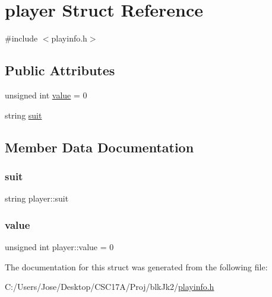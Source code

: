 \hypertarget{structplayer}{}\section{player Struct Reference}
\label{structplayer}


{\ttfamily \#include $<$playinfo.\+h$>$}

\subsection*{Public Attributes}
\begin{DoxyCompactItemize}
\item 
unsigned int \hyperlink{structplayer_a16a403f59b795c914193b68929cd0166}{value} = 0
\item 
string \hyperlink{structplayer_ace5ff9c841167c6e7fb3df5812819f6b}{suit}
\end{DoxyCompactItemize}


\subsection{Member Data Documentation}
\hypertarget{structplayer_ace5ff9c841167c6e7fb3df5812819f6b}{}\label{structplayer_ace5ff9c841167c6e7fb3df5812819f6b} 
\subsubsection{\texorpdfstring{suit}{suit}}
{\footnotesize\ttfamily string player\+::suit}

\hypertarget{structplayer_a16a403f59b795c914193b68929cd0166}{}\label{structplayer_a16a403f59b795c914193b68929cd0166} 
\subsubsection{\texorpdfstring{value}{value}}
{\footnotesize\ttfamily unsigned int player\+::value = 0}



The documentation for this struct was generated from the following file\+:\begin{DoxyCompactItemize}
\item 
C\+:/\+Users/\+Jose/\+Desktop/\+C\+S\+C17\+A/\+Proj/blk\+Jk2/\hyperlink{playinfo_8h}{playinfo.\+h}\end{DoxyCompactItemize}
